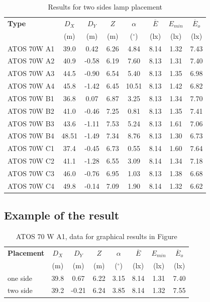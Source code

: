 \begin{table}[htb]
	\renewcommand{\arraystretch}{1.3}
	\caption{Results for two sides lamp placement}
 	\label{tab:twosideLamps}
	\centering
  \begin{tabular}{ l | c | c | c | c | c | c | c }
    \hline
    \textbf{Type} & $D_X$ & $D_Y$ & $Z$ & $\alpha$ & $\overline{E}$ & $E_{min}$ & $\overline{E}_o$\\ 
    & (m) & (m) & (m) & ($^\circ$) & (lx) & (lx) & (lx)\\ \hline
    ATOS 70W A1 & 39.0 & 0.42 & 6.26 & 4.84 & 8.14 & 1.32 & 7.43 \\ \hline
    ATOS 70W A2 & 40.9 & -0.58 & 6.19 & 7.60 & 8.13 & 1.31 & 7.40\\ \hline
    ATOS 70W A3 & 44.5 & -0.90 & 6.54 & 5.40 & 8.13 & 1.35 & 6.98\\ \hline
    ATOS 70W A4 & 45.8 & -1.42 & 6.45 & 10.51 & 8.13 & 1.42 & 6.82\\ \hline\hline
    ATOS 70W B1 & 36.8 & 0.07 & 6.87 & 3.25 & 8.13 & 1.34 & 7.70\\ \hline
    ATOS 70W B2 & 41.0 & -0.46 & 7.25 & 0.81 & 8.13 & 1.35 & 7.41\\ \hline
    ATOS 70W B3 & 43.6 & -1.11 & 7.53 & 5.24 & 8.13 & 1.61 & 7.06\\ \hline
    ATOS 70W B4 & 48.51 & -1.49 & 7.34 & 8.76 & 8.13 & 1.30 & 6.73\\ \hline\hline
    ATOS 70W C1 & 37.4 & -0.45 & 6.73 & 0.55 & 8.14 & 1.60 & 7.64\\ \hline
    ATOS 70W C2 & 41.1 & -1.28 & 6.55 & 3.09 & 8.14 & 1.34 & 7.18\\ \hline
    ATOS 70W C3 & 46.0 & -0.76 & 6.95 & 1.03 & 8.13 & 1.38 & 6.68\\ \hline
    ATOS 70W C4 & 49.8 & -0.14 & 7.09 & 1.90 & 8.14 & 1.32 & 6.62\\ \hline
  \end{tabular}
\end{table}

\subsection{Example of the result}

\begin{table}[htb]
	\renewcommand{\arraystretch}{1.3}
	\caption{ATOS 70 W A1, data for graphical results in Figure}
 	\label{tab:example}
	\centering
  \begin{tabular}{ l | c | c | c | c | c | c | c }
    \hline
    \textbf{Placement} & $D_X$ & $D_Y$ & $Z$ & $\alpha$ & $\overline{E}$ & $E_{min}$ & $\overline{E}_o$\\ 
    & (m) & (m) & (m) & ($^\circ$) & (lx) & (lx) & (lx)\\ \hline
    one side & 39.8 & 0.67 & 6.22 & 3.15 & 8.14 & 1.31 & 7.40\\ \hline
    two side & 39.2 & -0.21 & 6.24 & 3.85 & 8.14 & 1.32 & 7.55 \\ \hline
  \end{tabular}
\end{table}

